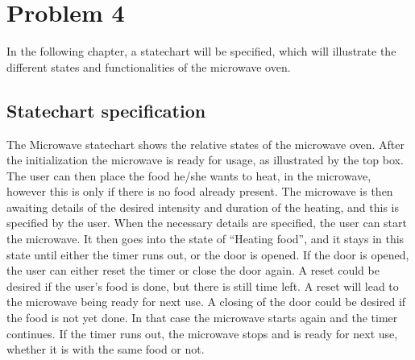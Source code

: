 \chapter{Problem 4}

In the following chapter, a statechart will be specified, which will illustrate the different states and functionalities of the microwave oven.

\section{Statechart specification}


The Microwave statechart shows the relative states of the microwave oven. After the initialization the microwave is ready for usage, as illustrated by the top box. The user can then place the food he/she wants to heat, in the microwave, however this is only if there is no food already present. 
The microwave is then awaiting details of the desired intensity and duration of the heating, and this is specified by the user. When the necessary details are specified, the user can start the microwave. 
It then goes into the state of “Heating food”, and it stays in this state until either the timer runs out, or the door is opened. If the door is opened, the user can either reset the timer or close the door again. A reset could be desired if the user’s food is done, but there is still time left. A reset will lead to the microwave being ready for next use. A closing of the door could be desired if the food is not yet done. In that case the microwave starts again and the timer continues. If the timer runs out, the microwave stops and is ready for next use, whether it is with the same food or not. 
